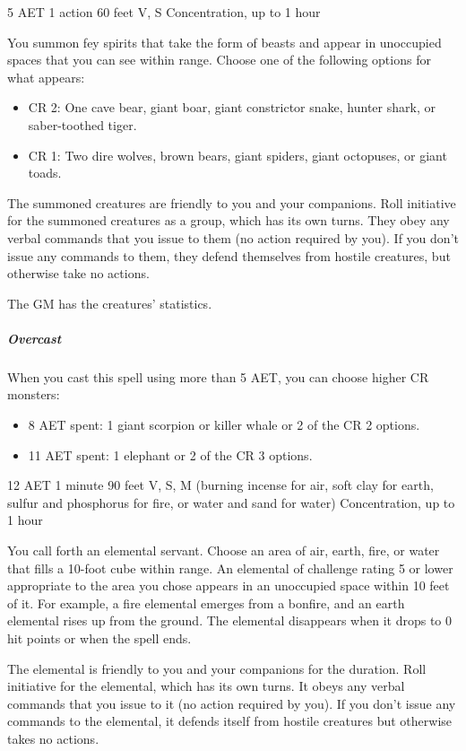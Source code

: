 {5 AET}
{1 action}
{60 feet}
{V, S}
{Concentration, up to 1 hour}

You summon fey spirits that take the form of beasts and appear in unoccupied spaces that you can see within range. Choose one of the following options for what appears:

\begin{itemize}
\item CR 2: One cave bear, giant boar, giant constrictor snake, hunter shark, or saber-toothed tiger.
\item CR 1: Two dire wolves, brown bears, giant spiders, giant octopuses, or giant toads.
\end{itemize}

The summoned creatures are friendly to you and your companions. Roll initiative for the summoned creatures as a group, which has its own turns. They obey any verbal commands that you issue to them (no action required by you). If you don't issue any commands to them, they defend themselves from hostile creatures, but otherwise take no actions.

The GM has the creatures' statistics.

\subparagraph*{Overcast} When you cast this spell using more than 5 AET, you can choose higher CR monsters:
\begin{itemize}
\item 8 AET spent: 1 giant scorpion or killer whale or 2 of the CR 2 options.
\item 11 AET spent: 1 elephant or 2 of the CR 3 options.
\end{itemize}


{12 AET}
{1 minute}
{90 feet}
{V, S, M (burning incense for air, soft clay for earth, sulfur and phosphorus for fire, or water and sand for water)}
{Concentration, up to 1 hour}

You call forth an elemental servant. Choose an area of air, earth, fire, or water that fills a 10-foot cube within range. An elemental of challenge rating 5 or lower appropriate to the area you chose appears in an unoccupied space within 10 feet of it. For example, a fire elemental emerges from a bonfire, and an earth elemental rises up from the ground. The elemental disappears when it drops to 0 hit points or when the spell ends.

The elemental is friendly to you and your companions for the duration. Roll initiative for the elemental, which has its own turns. It obeys any verbal commands that you issue to it (no action required by you). If you don't issue any commands to the elemental, it defends itself from hostile creatures but otherwise takes no actions.


